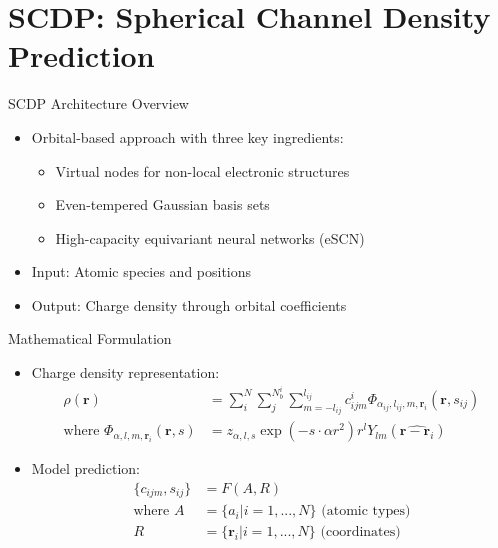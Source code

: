 \section{SCDP: Spherical Channel Density Prediction}

\begin{frame}{SCDP Architecture Overview}
    \begin{itemize}
        \item Orbital-based approach with three key ingredients:
        \begin{itemize}
            \item Virtual nodes for non-local electronic structures
            \item Even-tempered Gaussian basis sets
            \item High-capacity equivariant neural networks (eSCN)
        \end{itemize}
        \item Input: Atomic species and positions
        \item Output: Charge density through orbital coefficients
    \end{itemize}
\end{frame}

\begin{frame}{Mathematical Formulation}
    \begin{itemize}
        \item Charge density representation:
        \begin{align*}
            \rho(\mathbf{r}) &= \sum_i^N \sum_j^{N_b^i} \sum_{m = -l_{ij}}^{l_{ij}} c_{ijm}^i \Phi_{\alpha_{ij},l_{ij},m,\mathbf{r}_i}(\mathbf{r}, s_{ij}) \\
            \text{where } \Phi_{\alpha,l,m,\mathbf{r}_i}(\mathbf{r}, s) &= z_{\alpha,l,s} \exp(-s \cdot \alpha r^2) r^l Y_{lm}(\hat{\mathbf{r} - \mathbf{r}_i})
        \end{align*}
        \item Model prediction:
        \begin{align*}
            \{c_{ijm}, s_{ij}\} &= F(A, R) \\
            \text{where } A &= \{a_i | i = 1,...,N\} \text{ (atomic types)} \\
            R &= \{\mathbf{r}_i | i = 1,...,N\} \text{ (coordinates)}
        \end{align*}
    \end{itemize}
\end{frame}

